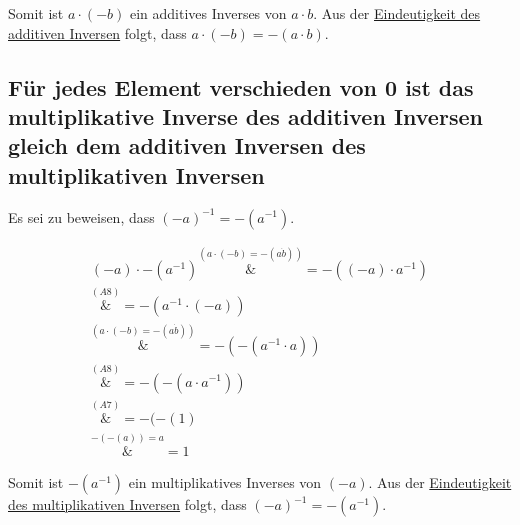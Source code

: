 \documentclass{article}
\begin{document}
Somit ist $a \cdot (-b)$ ein additives Inverses von $a \cdot b$. Aus der
\hyperref[eindeutigkeit_add_inv]{Eindeutigkeit des additiven Inversen}
folgt, dass $a \cdot (-b) = -(a \cdot b)$.


\subsection{Für jedes Element verschieden von 0 ist das multiplikative Inverse des additiven Inversen gleich dem additiven Inversen des multiplikativen Inversen}

Es sei zu beweisen, dass $(-a)^{-1} = -(a^{-1})$.

\begin{align*}
  (-a) \cdot -(a^{-1}) \overset{\hyperref[prod_add_inv]{(a \cdot (-b) = -(a \dot b))}}&= -((-a) \cdot a^{-1}) \\
                       \overset{\hyperref[a8]{(A8)}}&= -(a^{-1} \cdot (-a)) \\
                       \overset{\hyperref[prod_add_inv]{(a \cdot (-b) = -(a \dot b))}}&= -(-(a^{-1} \cdot a)) \\
                       \overset{\hyperref[a8]{(A8)}}&= -(-(a \cdot a^{-1})) \\
                       \overset{\hyperref[a7]{(A7)}}&= -(-(1) \\
                       \overset{\hyperref[add_add_inv]{-(-(a)) = a}}&= 1
\end{align*}

Somit ist $-(a^{-1})$ ein multiplikatives Inverses von $(-a)$. Aus der
\hyperref[eindeutigkeit_mul_inv]{Eindeutigkeit des multiplikativen Inversen}
folgt, dass $(-a)^{-1} = -(a^{-1})$.
\end{document}
